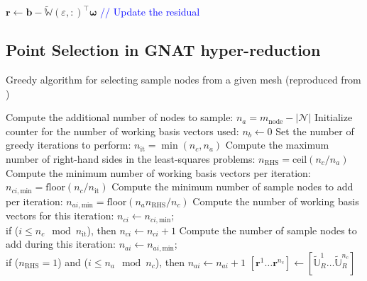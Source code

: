 \documentclass[11pt]{article}
\renewcommand{\vec}[1]{\mathbf{#1}}
\begin{document}
\begin{algorithm}[H]
\begin{algorithmic} [1]
    \STATE $\vec{r} \leftarrow \vec{b} - \widetilde{\mathbb{W}}(\varepsilon, :)^\top \boldsymbol\omega$ \textcolor{blue}{// Update the residual}
\ENDWHILE
\end{algorithmic}
\end{algorithm}


\subsection{Point Selection in GNAT hyper-reduction}
\begin{algorithm}[H]
\caption{Greedy algorithm for selecting sample nodes from a given  mesh (reproduced from \cite{carlberg2013gnat})}
\label{greedy}
\begin{algorithmic}[1]
\STATE Compute the additional number of nodes to sample: $n_a = m_{\mathrm{node}} - |\mathcal{N}|$
\STATE Initialize counter for the number of working basis vectors used: $n_b \leftarrow 0$
\STATE Set the number of greedy iterations to perform: $n_{\mathrm{it}} = \min(n_c, n_a)$ 
\STATE Compute the maximum number of right-hand sides in the least-squares problems: $n_{\mathrm{RHS}} = \mathrm{ceil}(n_c / n_a)$
\STATE Compute the minimum number of working basis vectors per iteration: $n_{ci,\mathrm{min}} = \mathrm{floor}(n_c / n_{\mathrm{it}})$
\STATE Compute the minimum number of sample nodes to add per iteration: $n_{ai,\mathrm{min}} = \mathrm{floor}(n_a n_{\mathrm{RHS}} / n_c)$
\STATE Compute the number of working basis vectors for this iteration: $n_{ci} \leftarrow n_{ci,\mathrm{min}}$; 
\\ if ($i \leq n_c \mod n_{\mathrm{it}}$), then $n_{ci} \leftarrow n_{ci} + 1$
\STATE Compute the number of sample nodes to add during this iteration: $n_{ai} \leftarrow n_{ai,\mathrm{min}}$; 
\\ if ($n_{\mathrm{RHS}} = 1$) and ($i \leq n_a \mod n_c$), then $n_{ai} \leftarrow n_{ai} + 1$
\STATE $[\vec{r}^1 \ldots \vec{r}^{n_c}] \gets [\widetilde{\mathbb{U}}_R^1 \ldots \widetilde{\mathbb{U}}_R^{n_c}]$

\end{algorithmic}
\end{algorithm}
\end{document}
